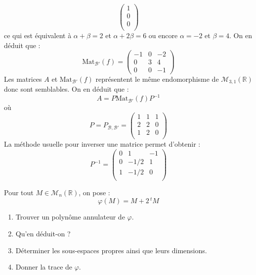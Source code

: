 \documentclass[a4paper,10pt]{report}
\begin{document}
\begin{enumerate}
$$\begin{pmatrix}
1 \\
0 \\
0 \\
\end{pmatrix}$$
ce qui est équivalent à $\alpha+ \beta =2$ et $\alpha+2 \beta =6$ ou encore $\alpha=-2$ et $\beta =4$. On en déduit que :
$$ \textrm{Mat}_{\mathcal{B}'}(f) = \begin{pmatrix}
-1 & 0 & -2 \\
0 & 3 & 4 \\
0 & 0 & -1
\end{pmatrix}$$
Les matrices $A$ et $\textrm{Mat}_{\mathcal{B}'}(f)$ représentent le même endomorphisme de $\mathcal{M}_{3,1}(\mathbb{R})$ donc sont semblables. On en déduit que :
$$ A = P \textrm{Mat}_{\mathcal{B}'}(f) P^{-1}$$
où 
$$P=P_{\mathcal{B}, \mathcal{B}'} = \begin{pmatrix}
1 & 1 & 1 \\
2 & 2 & 0 \\
1 & 2 & 0 \\
\end{pmatrix}$$
La méthode usuelle pour inverser une matrice permet d'obtenir :
$$ P^{-1} = \begin{pmatrix}
0 & 1 & -1 \\
0 & -1/2 & 1 \\
1 & -1/2 & 0 \\
\end{pmatrix}$$

\end{enumerate}

\begin{Exa}  Pour tout $M \in \mathcal{M}_n(\mathbb{R})$, on pose :
$$ \varphi(M) = M +2 \, {}^t M$$
\begin{enumerate}
\item Trouver un polynôme annulateur de $\varphi$.
\item Qu'en déduit-on ?
\item Déterminer les sous-espaces propres ainsi que leurs dimensions.
\item Donner la trace de $\varphi$.
\end{enumerate}
\end{Exa}

\corr 
\end{document}
